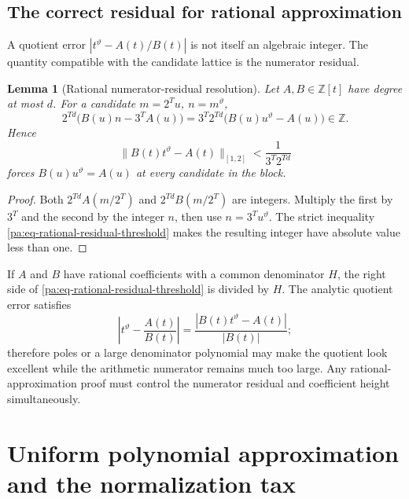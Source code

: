 \documentclass[11pt,oneside]{article}
\newtheorem{lemma}[theorem]{Lemma}
\theoremstyle{definition}
\theoremstyle{remark}
\newcommand{\Z}{\mathbb Z}
\newcommand{\thetaq}{\vartheta}
\begin{document}
\subsection{The correct residual for rational approximation}

A quotient error \(|t^{\thetaq}-A(t)/B(t)|\) is not itself an algebraic integer.  The
quantity compatible with the candidate lattice is the numerator residual.

\begin{lemma}[Rational numerator-residual resolution]
\label{pa:lem-rational-residual}
Let \(A,B\in\Z[t]\) have degree at most \(d\).  For a candidate
\(m=2^Tu\), \(n=m^{\thetaq}\),
\begin{equation}
 2^{Td}\bigl(B(u)n-3^TA(u)\bigr)
 =3^T2^{Td}\bigl(B(u)u^{\thetaq}-A(u)\bigr)
 \in\Z.
 \label{pa:eq-rational-residual-integer}
\end{equation}
Hence
\begin{equation}
 \bigl\|B(t)t^{\thetaq}-A(t)\bigr\|_{[1,2]}
 <\frac{1}{3^T2^{Td}}
 \label{pa:eq-rational-residual-threshold}
\end{equation}
forces \(B(u)u^{\thetaq}=A(u)\) at every candidate in the block.
\end{lemma}

\begin{proof}
Both \(2^{Td}A(m/2^T)\) and \(2^{Td}B(m/2^T)\) are integers.  Multiply the first by \(3^T\)
and the second by the integer \(n\), then use \(n=3^Tu^{\thetaq}\).  The strict inequality
\eqref{pa:eq-rational-residual-threshold} makes the resulting integer have absolute value less
than one.
\end{proof}

If \(A\) and \(B\) have rational coefficients with a common denominator \(H\), the right
side of \eqref{pa:eq-rational-residual-threshold} is divided by \(H\).  The analytic quotient
error satisfies
\[
 \left|t^{\thetaq}-\frac{A(t)}{B(t)}\right|
 =\frac{|B(t)t^{\thetaq}-A(t)|}{|B(t)|};
\]
therefore poles or a large denominator polynomial may make the quotient look excellent while
the arithmetic numerator remains much too large.  Any rational-approximation proof must
control the numerator residual and coefficient height simultaneously.

\section{Uniform polynomial approximation and the normalization tax}
\label{pa:sec-poly-lower}
\end{document}
